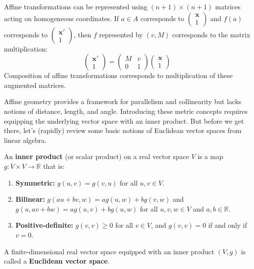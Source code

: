 Affine transformations can be represented using $(n+1) \times (n+1)$ matrices acting on homogeneous coordinates. If $a \in A$ corresponds to $\begin{pmatrix} \mathbf{x} \\ 1 \end{pmatrix}$ and $f(a)$ corresponds to $\begin{pmatrix} \mathbf{x}' \\ 1 \end{pmatrix}$, then $f$ represented by $(v, M)$ corresponds to the matrix multiplication:
\[
\begin{pmatrix} \mathbf{x}' \\ 1 \end{pmatrix} = \begin{pmatrix} M & v \\ 0 & 1 \end{pmatrix} \begin{pmatrix} \mathbf{x} \\ 1 \end{pmatrix}
\]
Composition of affine transformations corresponds to multiplication of these augmented matrices.

Affine geometry provides a framework for parallelism and collinearity but lacks notions of distance, length, and angle. Introducing these metric concepts requires equipping the underlying vector space with an inner product. But before we get there, let's (rapidly) review some basic notions of Euclidean vector spaces from linear algebra. 

\begin{definition} \label{def:inner_product}
An \textbf{inner product} (or scalar product) on a real vector space $V$ is a map $g: V \times V \to \mathbb{R}$ that is:
\begin{enumerate}
    \item \textbf{Symmetric:} $g(u, v) = g(v, u)$ for all $u, v \in V$.
    \item \textbf{Bilinear:} $g(au + bv, w) = a g(u, w) + b g(v, w)$ and $g(u, av + bw) = a g(u, v) + b g(u, w)$ for all $u, v, w \in V$ and $a, b \in \mathbb{R}$.
    \item \textbf{Positive-definite:} $g(v, v) \ge 0$ for all $v \in V$, and $g(v, v) = 0$ if and only if $v = 0$.
\end{enumerate}
A finite-dimensional real vector space equipped with an inner product $(V, g)$ is called a \textbf{Euclidean vector space}.
\end{definition}

